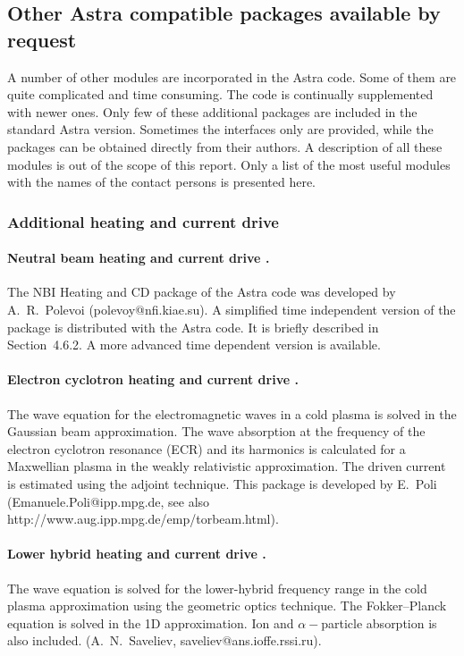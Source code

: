 \subsection{Other Astra compatible packages available by request}

A number of other modules are incorporated in the Astra code.
Some of them are quite complicated and time consuming. 
The code is continually supplemented with newer ones.
Only few of these additional packages are included in the 
standard Astra version.
Sometimes the interfaces only are provided, while the packages 
can be obtained directly from their authors. 
A description of all these modules is out of the scope of this report. 
Only a list of the most useful modules with the names of the
contact persons is presented here.

\subsubsection{Additional heating and current drive}

\paragraph{Neutral beam heating and current drive \rm\cite{Pole}.} 
The NBI Heating and CD package of the Astra code was developed by
A.~R.~Polevoi (polevoy@nfi.kiae.su). 
A simplified time independent version of the package is distributed with
the Astra code. 
It is briefly described in Section~4.6.2.
A more advanced time dependent version is available. 

\paragraph{Electron cyclotron heating and current drive \rm\cite{Poli}.} 
The wave equation for the electromagnetic waves in a cold plasma is
solved in the Gaussian beam approximation. 
The wave absorption at the frequency of the electron cyclotron resonance
(ECR) and its harmonics is calculated for a Maxwellian plasma in the
weakly relativistic approximation. 
The driven current is estimated using the adjoint technique.
This package
is developed by E.~Poli 
(Emanuele.Poli@ipp.mpg.de, see also 
http://www.aug.ipp.mpg.de/emp/torbeam.html).

\paragraph{Lower hybrid heating and current drive \rm\cite{EP}.} 
The wave equation is solved for the lower-hybrid frequency
range in the cold plasma approximation using the geometric optics
technique. 
The Fokker--Planck equation is solved in the 1D approximation.
Ion and $\alpha-$particle absorption is also included.
(A.~N.~Saveliev, saveliev@ans.ioffe.rssi.ru).

